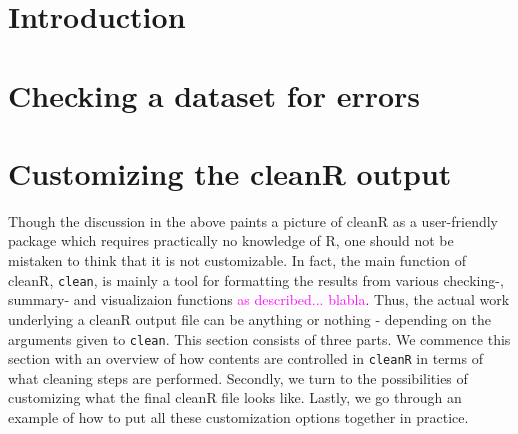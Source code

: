 \documentclass[article]{jss}
\newcommand{\hl}[1]{\textcolor{magenta}{#1}}
\newcommand{\R}[1]{\texttt{#1}}
\begin{document}
\section{Introduction}

\section{Checking a dataset for errors}


\section{Customizing the cleanR output}
Though the discussion in the above paints a picture of cleanR as a user-friendly package which requires practically no knowledge of R, one should not be mistaken to think that it is not customizable. In fact, the main function of cleanR, \R{clean}, is mainly a tool for formatting the results from various checking-, summary- and visualizaion functions \hl{as described... blabla}. Thus, the actual work underlying a cleanR output file can be anything or nothing - depending on the arguments given to \R{clean}. This section consists of three parts. We commence this section with an overview of how contents are controlled in \R{cleanR} in terms of what cleaning steps are performed. Secondly, we turn to the possibilities of customizing what the final cleanR file looks like. Lastly, we go through an example of how to put all these customization options together in practice.
\end{document}
